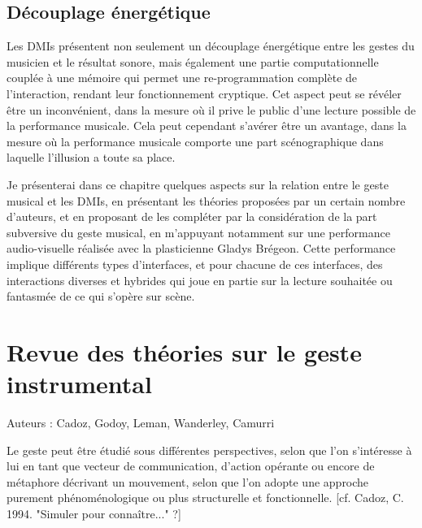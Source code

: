 \subsection{Découplage énergétique}

Les \glspl{DMI} présentent non seulement un découplage énergétique entre les gestes du musicien et le résultat sonore, mais également une partie computationnelle couplée à une mémoire qui permet une re-programmation complète de l'interaction, rendant leur fonctionnement cryptique. Cet aspect peut se révéler être un inconvénient, dans la mesure où il prive le public d’une lecture possible de la performance musicale. Cela peut cependant s’avérer être un avantage, dans la mesure où la performance musicale comporte une part scénographique dans laquelle l’illusion a toute sa place.

Je présenterai dans ce chapitre quelques aspects sur la relation entre le geste musical et les \glspl{DMI}, en présentant les théories proposées par un certain nombre d'auteurs, et en proposant de les compléter par la considération de la part subversive du geste musical, en m'appuyant notamment sur une performance audio-visuelle réalisée avec la plasticienne Gladys Brégeon. Cette performance implique différents types d’interfaces, et pour chacune de ces interfaces, des interactions diverses et hybrides qui joue en partie sur la lecture souhaitée ou fantasmée de ce qui s’opère sur scène.

\section{Revue des théories sur le geste instrumental}

Auteurs : Cadoz, Godoy, Leman, Wanderley, Camurri 

Le geste peut être étudié sous différentes perspectives, selon que l'on s'intéresse à lui en tant que vecteur de communication, d'action opérante ou encore de métaphore décrivant un mouvement, selon que l'on adopte une approche purement phénoménologique ou plus structurelle et fonctionnelle. [cf. Cadoz, C. 1994. "Simuler pour connaître..." ?]


